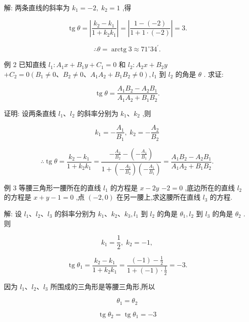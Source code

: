 \documentclass[lang=cn,newtx,10pt,scheme=chinese]{elegantbook}
\begin{document}
解: 两条直线的斜率为 \({k}_{1} = - 2,\;{k}_{2} = 1\) ,得

\[
  \operatorname{tg}\theta = \left| \frac{{k}_{2} - {k}_{1}}{1 + {k}_{2}{k}_{1}}\right| = \left| \frac{1 - \left( {-2}\right) }{1 + 1 \cdot \left( {-2}\right) }\right| = 3.
\]

\[
  \therefore \theta = \operatorname{arctg}3 \approx {71}^{ \circ }{34}^{\prime }\text{.}
\]

例 2 已知直线 \({l}_{1} : {A}_{1}x + {B}_{1}y + {C}_{1} = 0\) 和 \({l}_{2} : {A}_{2}x + {B}_{2}y\) \(+ {C}_{2} = 0\left( {{B}_{1} \neq 0\text{、}{B}_{2} \neq 0\text{、}{A}_{1}{A}_{2} + {B}_{1}{B}_{2} \neq 0}\right) ,{l}_{1}\) 到 \({l}_{2}\) 的角是 \(\theta\) . 求证:

\[
  \operatorname{tg}\theta = \frac{{A}_{1}{B}_{2} - {A}_{2}{B}_{1}}{{A}_{1}{A}_{2} + {B}_{1}{B}_{2}}.
\]

证明: 设两条直线 \({l}_{1}\text{、}{l}_{2}\) 的斜率分别为 \({k}_{1}\text{、}{k}_{2}\) ,则

\[
    {k}_{1} = - \frac{{A}_{1}}{{B}_{1}},\;{k}_{2} = - \frac{{A}_{2}}{{B}_{2}}
\]

\[
  \therefore \operatorname{tg}\theta = \frac{{k}_{2} - {k}_{1}}{1 + {k}_{2}{k}_{1}} = \frac{-\frac{{A}_{2}}{{B}_{2}} - \left( {-\frac{{A}_{1}}{{B}_{1}}}\right) }{1 + \left( {-\frac{{A}_{2}}{{B}_{2}}}\right) \left( {-\frac{{A}_{1}}{{B}_{1}}}\right) } = \frac{{A}_{1}{B}_{2} - {A}_{2}{B}_{1}}{{A}_{1}{A}_{2} + {B}_{1}{B}_{2}}\text{.}
\]

例 3 等腰三角形一腰所在的直线 \({l}_{1}\) 的方程是 \(x - {2y}\) \(- 2 = 0\) ,底边所在的直线 \({l}_{2}\) 的方程是 \(x + y - 1 = 0\) ,点 \(\left( {-2,0}\right)\) 在另一腰上,求这腰所在直线 \({l}_{3}\) 的方程.

解: 设 \({l}_{1}\text{、}{l}_{2}\text{、}{l}_{3}\) 的斜率分别为 \({k}_{1}\text{、}{k}_{2}\text{、}{k}_{3},{l}_{1}\) 到 \({l}_{2}\) 的角是 \({\theta }_{1},{l}_{2}\) 到 \({l}_{3}\) 的角是 \({\theta }_{2}\) . 则

\[
    {k}_{1} = \frac{1}{2},\;{k}_{2} = - 1,
\]

\[
  \operatorname{tg}{\theta }_{1} = \frac{{k}_{2} - {k}_{1}}{1 + {k}_{2}{k}_{1}} = \frac{\left( {-1}\right) - \frac{1}{2}}{1 + \left( {-1}\right) \cdot \frac{1}{2}} = - 3.
\]

因为 \({l}_{1}\text{、}{l}_{2}\text{、}{l}_{3}\) 所围成的三角形是等腰三角形,所以

\[
    {\theta }_{1} = {\theta }_{2}
\]

\[
  \operatorname{tg}{\theta }_{2} = \operatorname{tg}{\theta }_{1} = - 3
\]
\end{document}

